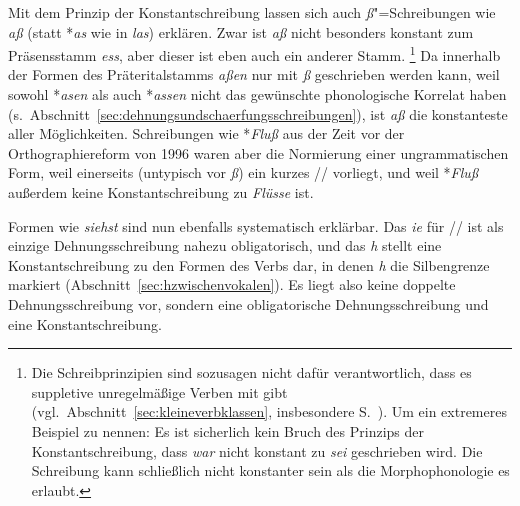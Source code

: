 Mit dem Prinzip der Konstantschreibung lassen sich auch \textit{ß}"=Schreibungen wie \textit{aß} (statt *\textit{as} wie in \textit{las}) erklären.
Zwar ist \textit{aß} nicht besonders konstant zum Präsensstamm \textit{ess}, aber dieser ist eben auch ein anderer Stamm.%
\footnote{Die Schreibprinzipien sind sozusagen nicht dafür verantwortlich, dass es suppletive unregelmäßige Verben mit gibt (vgl.\ Abschnitt~\ref{sec:kleineverbklassen}, insbesondere S.~\pageref{abs:kleineverbklassen123}).
Um ein extremeres Beispiel zu nennen:
Es ist sicherlich kein Bruch des Prinzips der Konstantschreibung, dass \textit{war} nicht konstant zu \textit{sei} geschrieben wird.
Die Schreibung kann schließlich nicht konstanter sein als die Morphophonologie es erlaubt.}
Da innerhalb der Formen des Präteritalstamms \textit{aßen} nur mit \textit{ß} geschrieben werden kann, weil sowohl *\textit{asen} als auch *\textit{assen} nicht das gewünschte phonologische Korrelat haben (s.\ Abschnitt~\ref{sec:dehnungsundschaerfungsschreibungen}), ist \textit{aß} die konstanteste aller Möglichkeiten.
Schreibungen wie *\textit{Fluß} aus der Zeit vor der Orthographiereform von 1996 waren aber die Normierung einer ungrammatischen Form, weil einerseits (untypisch vor \textit{ß}) ein kurzes // vorliegt, und weil *\textit{Fluß} außerdem keine Konstantschreibung zu \textit{Flüsse} ist.

Formen wie \textit{siehst} sind nun ebenfalls systematisch erklärbar.
Das \textit{ie} für // ist als einzige Dehnungsschreibung nahezu obligatorisch, und das \textit{h} stellt eine Konstantschreibung zu den Formen des Verbs dar, in denen \textit{h} die Silbengrenze markiert (Abschnitt~\ref{sec:hzwischenvokalen}).
Es liegt also keine doppelte Dehnungsschreibung vor, sondern eine obligatorische Dehnungsschreibung und eine Konstantschreibung.

